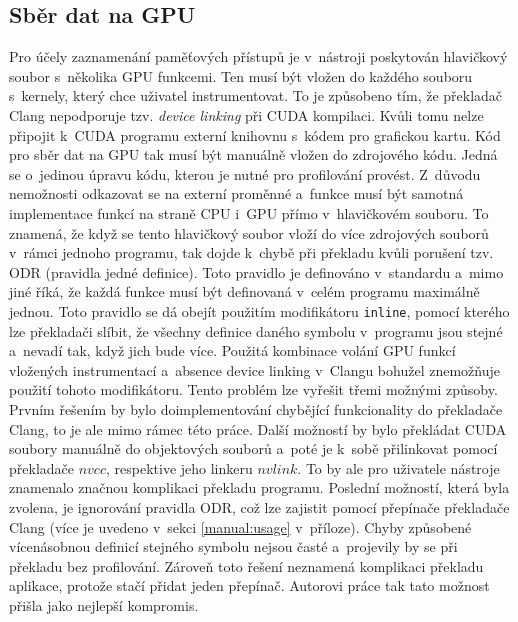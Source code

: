 \subsection{Sběr dat na GPU}
\label{sec:gpucollection}
Pro účely zaznamenání paměťových přístupů je v~nástroji poskytován hlavičkový soubor s~několika GPU funkcemi. Ten musí být vložen do každého souboru s~kernely, který chce uživatel instrumentovat. To je způsobeno tím, že překladač Clang nepodporuje tzv. \emph{device linking} při CUDA kompilaci. Kvůli tomu nelze připojit k~CUDA programu externí knihovnu s~kódem pro grafickou kartu. Kód pro sběr dat na GPU tak musí být manuálně vložen do zdrojového kódu. Jedná se o~jedinou úpravu kódu, kterou je nutné pro profilování provést.
Z~důvodu nemožnosti odkazovat se na externí proměnné a~funkce musí být samotná implementace funkcí na straně CPU i~GPU přímo v~hlavičkovém souboru. To znamená, že když se tento hlavičkový soubor vloží do více zdrojových souborů v~rámci jednoho programu, tak dojde k~chybě při překladu kvůli porušení tzv. ODR (pravidla jedné definice). Toto pravidlo je definováno v~\CPP\hspace{1mm}standardu \cite{cppiso} a~mimo jiné říká, že každá funkce musí být definovaná v~celém programu maximálně jednou. Toto pravidlo se dá obejít použitím modifikátoru \texttt{inline}, pomocí kterého lze překladači slíbit, že všechny definice daného symbolu v~programu jsou stejné a~nevadí tak, když jich bude více. Použitá kombinace volání GPU funkcí vložených instrumentací a~absence device linking v~Clangu bohužel znemožňuje použití tohoto modifikátoru. 
Tento problém lze vyřešit třemi možnými způsoby. Prvním řešením by bylo doimplementování chybějící funkcionality do překladače Clang, to je ale mimo rámec této práce. Další možností by bylo překládat CUDA soubory manuálně do objektových souborů a~poté je k~sobě přilinkovat pomocí překladače $nvcc$, respektive jeho \mbox{linkeru} $nvlink$. To by ale pro uživatele nástroje znamenalo značnou komplikaci překladu programu. Poslední možností, která byla zvolena, je ignorování pravidla ODR, což lze zajistit pomocí přepínače překladače Clang (více je uvedeno v~sekci \ref{manual:usage} v~příloze). Chyby způsobené vícenásobnou definicí stejného symbolu nejsou časté a~projevily by se při překladu bez profilování. Zároveň toto řešení neznamená komplikaci překladu aplikace, protože stačí přidat jeden přepínač. Autorovi práce tak tato možnost přišla jako nejlepší kompromis.

